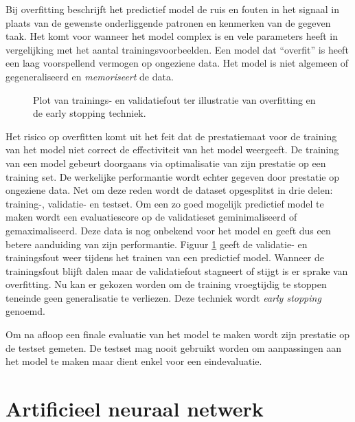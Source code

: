 \npar Bij overfitting beschrijft het predictief model de ruis en fouten in het signaal in plaats van de gewenste onderliggende patronen en kenmerken van de gegeven taak. Het komt voor wanneer het model complex is en vele parameters heeft in vergelijking met het aantal trainingsvoorbeelden. Een model dat ``overfit'' is heeft een laag voorspellend vermogen op ongeziene data. Het model is niet algemeen of gegeneraliseerd en  \textit{memoriseert} de data. 

\begin{figure}
	\centering
	\def\svgscale{0.7}
	
	\caption{Plot van trainings- en validatiefout ter illustratie van overfitting en de early stopping techniek.}
	\label{fig:overfitting}
\end{figure}

\npar Het risico op overfitten komt uit het feit dat de prestatiemaat voor de training van het model niet correct de effectiviteit van het model weergeeft. De training van een model gebeurt doorgaans via optimalisatie van zijn prestatie op een training set. De werkelijke performantie wordt echter gegeven door prestatie op ongeziene data. Net om deze reden wordt de dataset opgesplitst in drie delen: training-, validatie- en testset.
\npar Om een zo goed mogelijk predictief model te maken wordt een evaluatiescore op de validatieset geminimaliseerd of gemaximaliseerd. Deze data is nog onbekend voor het model en geeft dus een betere aanduiding van zijn performantie. Figuur \ref{fig:overfitting} geeft de validatie- en trainingsfout weer tijdens het trainen van een predictief model. Wanneer de trainingsfout blijft dalen maar de validatiefout stagneert of stijgt is er sprake van overfitting. Nu kan er gekozen worden om de training vroegtijdig te stoppen teneinde geen generalisatie te verliezen. Deze techniek wordt \textit{early stopping} genoemd.

\npar Om na afloop een finale evaluatie van het model te maken wordt zijn prestatie op de testset gemeten. De testset mag nooit gebruikt worden om aanpassingen aan het model te maken maar dient enkel voor een eindevaluatie.







\section{Artificieel neuraal netwerk}\label{sec:ann}

